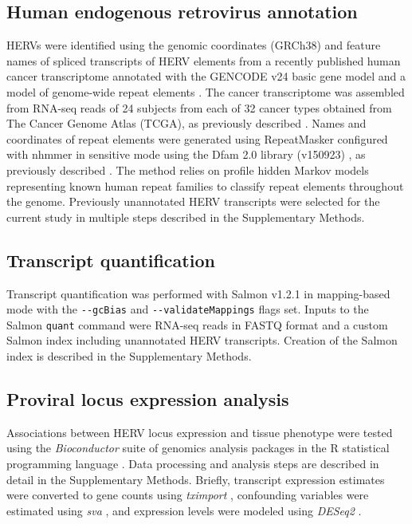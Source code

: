 \subsection*{Human endogenous retrovirus annotation}
HERVs were identified using the genomic coordinates (GRCh38) and feature names of spliced transcripts of HERV elements from a recently published human cancer transcriptome annotated with the GENCODE v24 basic gene model \citep{Frankish2018} and a model of genome-wide repeat elements \citep{Attig2019}.
The cancer transcriptome was assembled from RNA-seq reads of 24 subjects from each of 32 cancer types obtained from The Cancer Genome Atlas (TCGA), as previously described \citep{Attig2019}.
Names and coordinates of repeat elements were generated using RepeatMasker \citep{Smit2015} configured with nhmmer \citep{Wheeler2013} in sensitive mode using the Dfam 2.0 library (v150923) \citep{Hubley2015}, as previously described \citep{Attig2017}.
The method relies on profile hidden Markov models representing known human repeat families to classify repeat elements throughout the genome.
Previously unannotated HERV transcripts were selected for the current study in multiple steps described in the Supplementary Methods.

\subsection*{Transcript quantification}
Transcript quantification was performed with Salmon v1.2.1 \citep{Patro2017} in mapping-based mode with the \verb|--gcBias| and \verb|--validateMappings| flags set.
Inputs to the Salmon \verb|quant| command were RNA-seq reads in FASTQ format and a custom Salmon index including unannotated HERV transcripts.
Creation of the Salmon index is described in the Supplementary Methods.

\subsection*{Proviral locus expression analysis}
Associations between HERV locus expression and tissue phenotype were tested using the \emph{Bioconductor} suite of genomics analysis packages \citep{bioc} in the R statistical programming language \citep{R}.
Data processing and analysis steps are described in detail in the Supplementary Methods.
Briefly, transcript expression estimates were converted to gene counts using \emph{tximport} \citep{Soneson2015}, confounding variables were estimated using \emph{sva} \citep{sva}, and expression levels were modeled using \emph{DESeq2} \citep{Love2014}.

